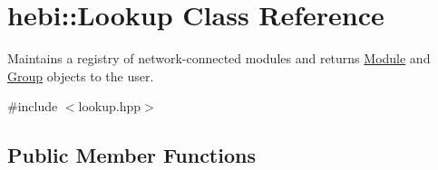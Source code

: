 \hypertarget{classhebi_1_1Lookup}{}\section{hebi\+:\+:Lookup Class Reference}
\label{classhebi_1_1Lookup}


Maintains a registry of network-\/connected modules and returns \hyperlink{classhebi_1_1Module}{Module} and \hyperlink{classhebi_1_1Group}{Group} objects to the user.  




{\ttfamily \#include $<$lookup.\+hpp$>$}

\subsection*{Public Member Functions}
